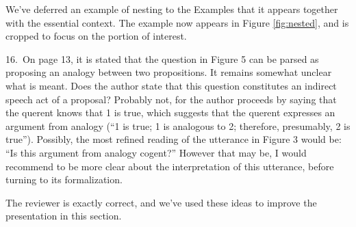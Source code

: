 We've deferred an example of nesting to the Examples that it appears together with the essential context.
The example now appears in Figure \ref{fig:nested}, and is cropped
to focus on the portion of interest.

\begin{mdframed}[backgroundcolor=orange!10]
16.~On page 13, it is stated that the question in Figure 5 can be parsed as proposing an analogy between two propositions. It remains somewhat unclear what is meant. Does the author state that this question constitutes an indirect speech act of a proposal? Probably not, for the author proceeds by saying that the querent knows that 1 is true, which suggests that the querent expresses an argument from analogy (``1 is true; 1 is analogous to 2; therefore, presumably, 2 is true''). Possibly, the most refined reading of the utterance in Figure 3  would be: ``Is this argument from analogy cogent?'' However that may be, I would recommend to be more clear about the interpretation of this utterance, before turning to its formalization.
\end{mdframed}

The reviewer is exactly correct, and we've used these ideas to improve the presentation in this section.





